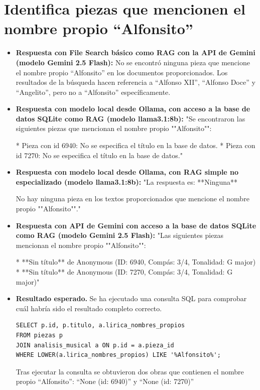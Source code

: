 \section{Identifica piezas que mencionen el nombre propio ``Alfonsito''}
\begin{itemize}
    \item \textbf{Respuesta con File Search básico como RAG con la API de Gemini (modelo Gemini 2.5 Flash):} No se encontró ninguna pieza que mencione el nombre propio ``Alfonsito'' en los documentos proporcionados. Los resultados de la búsqueda hacen referencia a ``Alfonso XII'', ``Alfonso Doce'' y ``Angelito'', pero no a ``Alfonsito'' específicamente.
    \item \textbf{Respuesta con modelo local desde Ollama, con acceso a la base de datos SQLite como RAG (modelo llama3.1:8b):} "Se encontraron las siguientes piezas que mencionan el nombre propio ""Alfonsito"":

* Pieza con id 6940: No se especifica el título en la base de datos.
* Pieza con id 7270: No se especifica el título en la base de datos."
\item \textbf{Respuesta con modelo local desde Ollama, con RAG simple no especializado (modelo llama3.1:8b):} "La respuesta es: **Ninguna**

No hay ninguna pieza en los textos proporcionados que mencione el nombre propio ""Alfonsito""."
\item \textbf{Respuesta con API de Gemini con acceso a la base de datos SQLite como RAG (modelo Gemini 2.5 Flash):} "Las siguientes piezas mencionan el nombre propio ""Alfonsito"":

*   **Sin título** de Anonymous (ID: 6940, Compás: 3/4, Tonalidad: G major)
*   **Sin título** de Anonymous (ID: 7270, Compás: 3/4, Tonalidad: G major)"
\item \textbf{Resultado esperado.} Se ha ejecutado una consulta SQL para comprobar cuál habría sido el resultado completo correcto.
    \begin{verbatim}
SELECT p.id, p.titulo, a.lirica_nombres_propios
FROM piezas p
JOIN analisis_musical a ON p.id = a.pieza_id
WHERE LOWER(a.lirica_nombres_propios) LIKE '%Alfonsito%';
    \end{verbatim}    
    Tras ejecutar la consulta se obtuvieron dos obras que contienen el nombre propio ``Alfonsito'': ``None (id: 6940)'' y ``None (id: 7270)'' 


\end{itemize}
